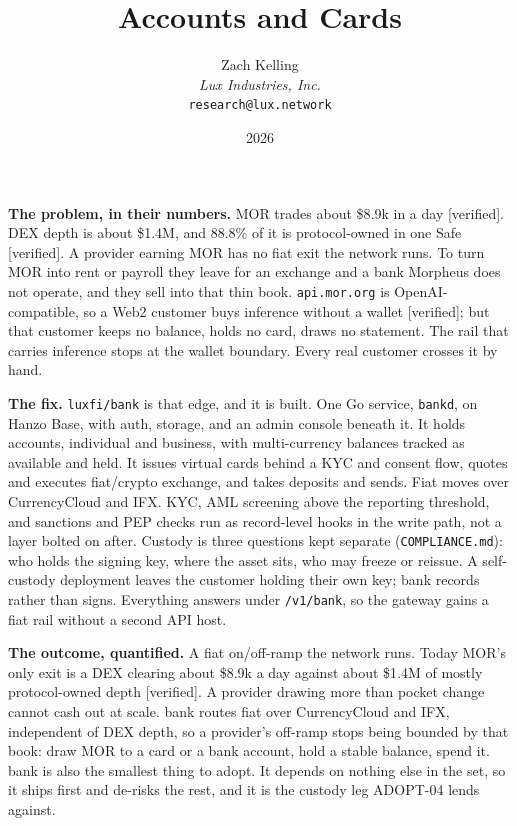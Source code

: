 \documentclass[11pt,a4paper]{article}
\title{Accounts and Cards}
\author{Zach Kelling\\\textit{Lux Industries, Inc.}\\\texttt{research@lux.network}}
\date{2026}
\newcommand{\code}[1]{\texttt{\small #1}}
\begin{document}
\luxcoverpage
\sloppy


\noindent\textbf{The problem, in their numbers.}
MOR trades about \$8.9k in a day [verified]. DEX depth is about \$1.4M, and 88.8\% of it is
protocol-owned in one Safe [verified]. A provider earning MOR has no fiat exit the network runs. To
turn MOR into rent or payroll they leave for an exchange and a bank Morpheus does not operate, and
they sell into that thin book. \code{api.mor.org} is OpenAI-compatible, so a Web2 customer buys
inference without a wallet [verified]; but that customer keeps no balance, holds no card, draws no
statement. The rail that carries inference stops at the wallet boundary. Every real customer crosses
it by hand.

\vspace{0.35ex}
\noindent\textbf{The fix.}
\code{luxfi/bank} is that edge, and it is built. One Go service, \code{bankd}, on Hanzo Base, with
auth, storage, and an admin console beneath it. It holds accounts, individual and business, with
multi-currency balances tracked as available and held. It issues virtual cards behind a KYC and
consent flow, quotes and executes fiat/crypto exchange, and takes deposits and sends. Fiat moves over
CurrencyCloud and IFX. KYC, AML screening above the reporting threshold, and sanctions and PEP checks
run as record-level hooks in the write path, not a layer bolted on after. Custody is three questions
kept separate (\code{COMPLIANCE.md}): who holds the signing key, where the asset sits, who may freeze
or reissue. A self-custody deployment leaves the customer holding their own key; bank records rather
than signs. Everything answers under \code{/v1/bank}, so the gateway gains a fiat rail without a
second API host.

\vspace{0.35ex}
\noindent\textbf{The outcome, quantified.}
A fiat on/off-ramp the network runs. Today MOR's only exit is a DEX clearing about \$8.9k a day
against about \$1.4M of mostly protocol-owned depth [verified]. A provider drawing more than pocket
change cannot cash out at scale. bank routes fiat over CurrencyCloud and IFX, independent of DEX
depth, so a provider's off-ramp stops being bounded by that book: draw MOR to a card or a bank
account, hold a stable balance, spend it. bank is also the smallest thing to adopt. It depends on
nothing else in the set, so it ships first and de-risks the rest, and it is the custody leg ADOPT-04
lends against.
\end{document}
